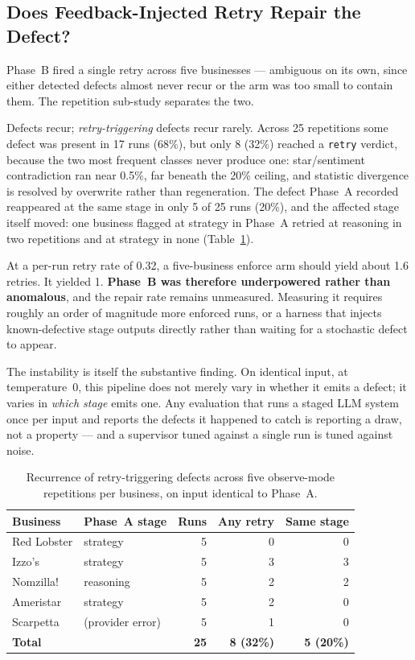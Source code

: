 \documentclass[runningheads]{llncs}
\begin{document}
\subsection{Does Feedback-Injected Retry Repair the Defect?}

Phase~B fired a single retry across five businesses --- ambiguous on its own,
since either detected defects almost never recur or the arm was too small to
contain them. The repetition sub-study separates the two.

Defects recur; \emph{retry-triggering} defects recur rarely. Across 25 repetitions
some defect was present in 17 runs (68\%), but only 8 (32\%) reached a
\texttt{retry} verdict, because the two most frequent classes never produce one:
star/sentiment contradiction ran near 0.5\%, far beneath the 20\% ceiling, and
statistic divergence is resolved by overwrite rather than regeneration. The defect
Phase~A recorded reappeared at the same stage in only 5 of 25 runs (20\%), and the
affected stage itself moved: one business flagged at strategy in Phase~A retried
at reasoning in two repetitions and at strategy in none (Table~\ref{tab:repair}).

At a per-run retry rate of 0.32, a five-business enforce arm should yield about
1.6 retries. It yielded 1. \textbf{Phase~B was therefore underpowered rather than
anomalous}, and the repair rate remains unmeasured. Measuring it requires roughly
an order of magnitude more enforced runs, or a harness that injects
known-defective stage outputs directly rather than waiting for a stochastic defect
to appear.

The instability is itself the substantive finding. On identical input, at
temperature~0, this pipeline does not merely vary in whether it emits a defect; it
varies in \emph{which stage} emits one. Any evaluation that runs a staged LLM
system once per input and reports the defects it happened to catch is reporting a
draw, not a property --- and a supervisor tuned against a single run is tuned
against noise.

\begin{table}[t]
\caption{Recurrence of retry-triggering defects across five observe-mode
repetitions per business, on input identical to Phase~A.}
\label{tab:repair}
\centering
\begin{tabular}{llrrr}
\toprule
Business & Phase~A stage & Runs & Any retry & Same stage \\
\midrule
Red Lobster       & strategy          & 5 & 0 & 0 \\
Izzo's            & strategy          & 5 & 3 & 3 \\
Nomzilla!         & reasoning         & 5 & 2 & 2 \\
Ameristar         & strategy          & 5 & 2 & 0 \\
Scarpetta         & (provider error)  & 5 & 1 & 0 \\
\midrule
\textbf{Total}    &                   & \textbf{25} & \textbf{8 (32\%)} & \textbf{5 (20\%)} \\
\bottomrule
\end{tabular}
\end{table}
\end{document}
